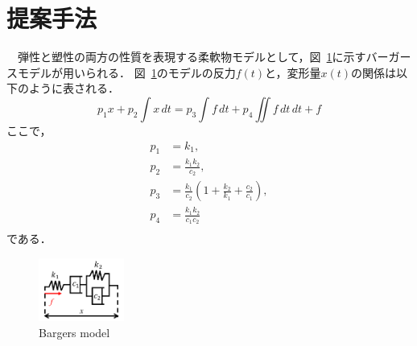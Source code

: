 \documentclass[a4paper]{jarticle}
\begin{document}
\section{提案手法}
　弾性と塑性の両方の性質を表現する柔軟物モデルとして，図~\ref{fig:BS_model}に示すバーガースモデルが用いられる\cite{ref_MSD}．
図~\ref{fig:BS_model}のモデルの反力$f(t)$と，変形量$x(t)$の関係は以下のように表される．
\begin{equation}
    p_1 {x} + p_2 \int{x}\,dt = p_3\int{f}\,dt +p_4\iint{f}\,dt\,dt  + f
    \label{eq:BSmodel}
\end{equation}
ここで，
\begin{equation}
    \begin{aligned}
        p_1 &= k_1,  \\
        p_2 &= \frac{k_1 k_2}{c_2},    \\
        p_3 &= \frac{k_1}{c_2}\left(1+\frac{k_2}{k_1}+\frac{c_2}{c_1}\right),\\
        p_4 &= \frac{k_1k_2}{c_1 c_2} \\
    \end{aligned}
    \label{eq:p2ck}
\end{equation}
である．
\begin{figure}[tb]
    \centering
    \includegraphics[width=0.25\textwidth]{BS_model.pdf}
    \caption{Bargers model}
    \label{fig:BS_model}
\end{figure}
\end{document}
